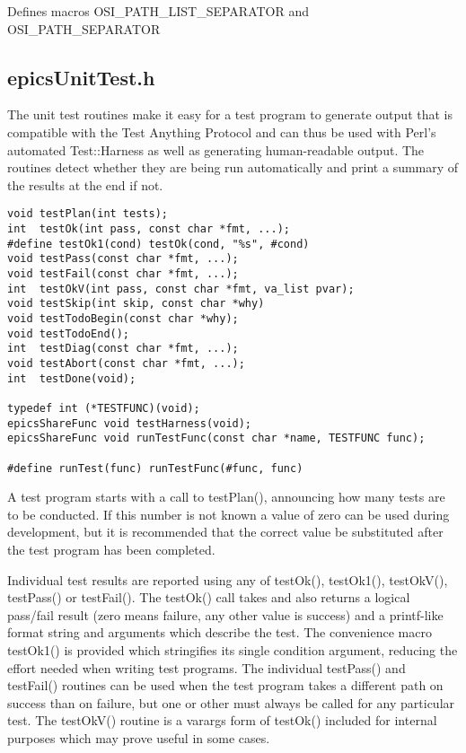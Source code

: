 Defines macros OSI\_PATH\_LIST\_SEPARATOR and OSI\_PATH\_SEPARATOR

\subsection{epicsUnitTest.h}

The unit test routines make it easy for a test program to generate output that is compatible with the Test Anything Protocol and can thus be used with Perl's automated Test::Harness as well as generating human-readable output.
The routines detect whether they are being run automatically and print a summary of the results at the end if not.

\begin{verbatim}
void testPlan(int tests);
int  testOk(int pass, const char *fmt, ...);
#define testOk1(cond) testOk(cond, "%s", #cond)
void testPass(const char *fmt, ...);
void testFail(const char *fmt, ...);
int  testOkV(int pass, const char *fmt, va_list pvar);
void testSkip(int skip, const char *why)
void testTodoBegin(const char *why);
void testTodoEnd();
int  testDiag(const char *fmt, ...);
void testAbort(const char *fmt, ...);
int  testDone(void);

typedef int (*TESTFUNC)(void);
epicsShareFunc void testHarness(void);
epicsShareFunc void runTestFunc(const char *name, TESTFUNC func);

#define runTest(func) runTestFunc(#func, func)
\end{verbatim}

A test program starts with a call to testPlan(), announcing how many tests are to be conducted.
If this number is not known a value of zero can be used during development, but it is recommended that the correct value be substituted after the test program has been completed.

Individual test results are reported using any of testOk(), testOk1(), testOkV(), testPass() or testFail().
The testOk() call takes and also returns a logical pass/fail result (zero means failure, any other value is success) and a printf-like format string and arguments which describe the test.
The convenience macro testOk1() is provided which stringifies its single condition argument, reducing the effort needed when writing test programs.
The individual testPass() and testFail() routines can be used when the test program takes a different path on success than on failure, but one or other must always be called for any particular test.
The testOkV() routine is a varargs form of testOk() included for internal purposes which may prove useful in some cases.

